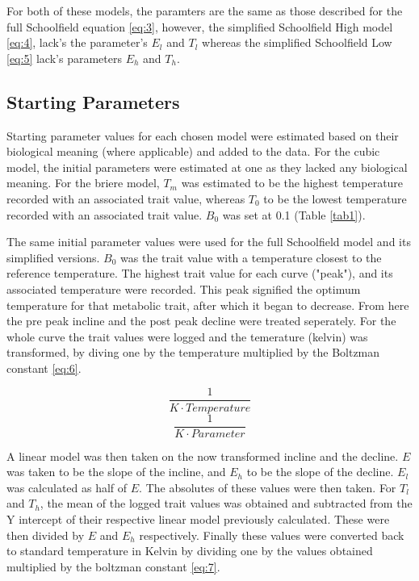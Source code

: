 \documentclass[11pt]{article}
\begin{document}
	For both of these models, the paramters are the same as those described for the full Schoolfield equation \eqref{eq:3}, however, the simplified Schoolfield High model \eqref{eq:4}, lack's the parameter's \(E_l\) and \(T_l\) whereas the simplified Schoolfield Low \eqref{eq:5} lack's parameters \(E_h\) and \(T_h\). 
	
	\subsection{Starting Parameters}
	Starting parameter values for each chosen model were estimated based on their biological meaning (where applicable) and added to the data. For the cubic model, the initial parameters were estimated at one as they lacked any biological meaning. For the briere model, \(T_m\) was estimated to be the highest temperature recorded with an associated trait value, whereas \(T_0\) to be the lowest temperature recorded with an associated trait value. \(B_0\) was set at 0.1 (Table \ref{tab1}). 
	
	The same initial parameter values were used for the full Schoolfield model and its simplified versions. \(B_0\) was the trait value with a temperature closest to the reference temperature. The highest trait value for each curve ("peak"), and its associated temperature were recorded. This peak signified the optimum temperature for that metabolic trait, after which it began to decrease. From here the pre peak incline and the post peak decline were treated seperately. For the whole curve the trait values were logged and the temerature (kelvin) was transformed, by diving one by the temperature multiplied by the Boltzman constant \eqref{eq:6}.
	 
	\begin{multicols}{2}
		\begin{equation}
		\frac{1}{K \cdot Temperature} \label{eq:6}
		\end{equation} 
		\begin{equation}
		\frac{1}{K \cdot Parameter} \label{eq:7}
		\end{equation}
	\end{multicols}
	
	A linear model was then taken on the now transformed incline and the decline. \(E\) was taken to be the slope of the incline, and \(E_h\) to be the slope of the decline. \(E_l\) was calculated as half of \(E\). The absolutes of these values were then taken. For \(T_l\) and \(T_h\), the mean of the logged trait values was obtained and subtracted from the Y intercept of their respective linear model previously calculated. These were then divided by \(E\) and \(E_h\) respectively. Finally these values were converted back to standard temperature in Kelvin by dividing one by the values obtained multiplied by the boltzman constant \eqref{eq:7}.
	
\end{document}
